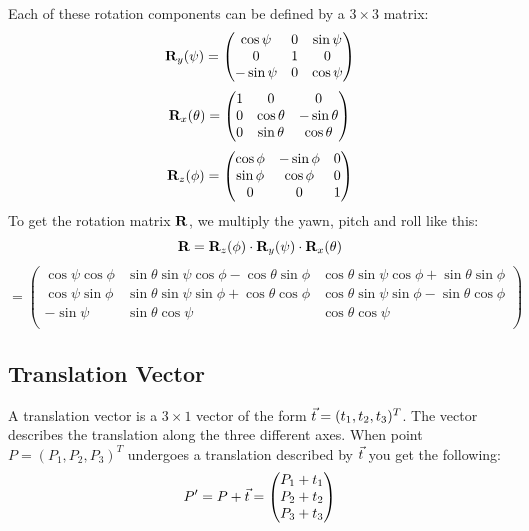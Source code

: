 Each of these rotation components can be defined by a $3\times3$ matrix:
\begin{equation}
    \mathbf{R}_y(\psi) = \begin{pmatrix}
        \cos\psi & 0 & \sin\psi \\
        0 & 1 & 0 \\
        -\sin\psi & 0 & \cos\psi
    \end{pmatrix}
\end{equation}
\begin{equation}
    \mathbf{R}_x(\theta) = \begin{pmatrix}
        1 & 0 & 0 \\
        0 & \cos\theta & -\sin\theta \\
        0 & \sin\theta & \cos\theta \\
    \end{pmatrix}
\end{equation}
\begin{equation}
    \mathbf{R}_z(\phi) = \begin{pmatrix}
        \cos\phi & -\sin\phi & 0 \\
        \sin\phi & \cos\phi & 0 \\
        0 & 0 & 1
    \end{pmatrix}
\end{equation}
To get the rotation matrix $\mathbf{R}$, we multiply the yawn, pitch and roll like this:
\begin{equation} \label{eq:rotation}
    \mathbf{R} = \mathbf{R}_z(\phi)\cdot\mathbf{R}_y(\psi)\cdot\mathbf{R}_x(\theta)
\end{equation}
\begin{equation*}
    = \begin{pmatrix}
    \cos\psi\cos\phi & \sin\theta\sin\psi\cos\phi - \cos\theta\sin\phi & \cos\theta\sin\psi\cos\phi + \sin\theta\sin\phi \\
    \cos\psi\sin\phi & \sin\theta\sin\psi\sin\phi + \cos\theta\cos\phi & \cos\theta\sin\psi\sin\phi - \sin\theta\cos\phi \\
    -\sin\psi          & \sin\theta\cos\psi                                  & \cos\theta\cos\psi \\
  \end{pmatrix} 
\end{equation*}

\subsection{Translation Vector}
A translation vector is a $3\times1$ vector of the form $\vec t = (t_1, t_2, t_3)^T$. The vector describes the translation along the three different axes. When point $P = (P_1, P_2, P_3)^T$ undergoes a translation described by $\vec t$ you get the following:
\begin{equation}
    P' = P + \vec t = \begin{pmatrix}
        P_1 + t_1 \\ P_2 + t_2 \\ P_3 + t_3
    \end{pmatrix}
\end{equation}

